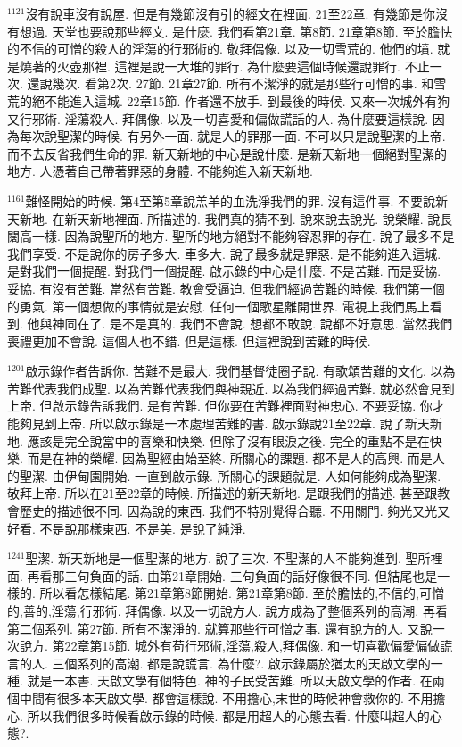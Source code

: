 \documentclass{book}
\begin{document}
$^{1121}$沒有說車沒有說屋.
但是有幾節沒有引的經文在裡面.
21至22章.
有幾節是你沒有想過.
天堂也要說那些經文.
是什麼.
我們看第21章.
第8節.
21章第8節.
至於膽怯的不信的可憎的殺人的淫蕩的行邪術的.
敬拜偶像.
以及一切雪荒的.
他們的墳.
就是燒著的火壺那裡.
這裡是說一大堆的罪行.
為什麼要這個時候還說罪行.
不止一次.
還說幾次.
看第2次.
27節.
21章27節.
所有不潔淨的就是那些行可憎的事.
和雪荒的絕不能進入這城.
22章15節.
作者還不放手.
到最後的時候.
又來一次城外有狗又行邪術.
淫蕩殺人.
拜偶像.
以及一切喜愛和偏做謊話的人.
為什麼要這樣說.
因為每次說聖潔的時候.
有另外一面.
就是人的罪那一面.
不可以只是說聖潔的上帝.
而不去反省我們生命的罪.
新天新地的中心是說什麼.
是新天新地一個絕對聖潔的地方.
人憑著自己帶著罪惡的身體.
不能夠進入新天新地.

$^{1161}$難怪開始的時候.
第4至第5章說羔羊的血洗淨我們的罪.
沒有這件事.
不要說新天新地.
在新天新地裡面.
所描述的.
我們真的猜不到.
說來說去說光.
說榮耀.
說長闊高一樣.
因為說聖所的地方.
聖所的地方絕對不能夠容忍罪的存在.
說了最多不是我們享受.
不是說你的房子多大.
車多大.
說了最多就是罪惡.
是不能夠進入這城.
是對我們一個提醒.
對我們一個提醒.
啟示錄的中心是什麼.
不是苦難.
而是妥協.
妥協.
有沒有苦難.
當然有苦難.
教會受逼迫.
但我們經過苦難的時候.
我們第一個的勇氣.
第一個想做的事情就是安慰.
任何一個歌星離開世界.
電視上我們馬上看到.
他與神同在了.
是不是真的.
我們不會說.
想都不敢說.
說都不好意思.
當然我們喪禮更加不會說.
這個人也不錯.
但是這樣.
但這裡說到苦難的時候.

$^{1201}$啟示錄作者告訴你.
苦難不是最大.
我們基督徒圈子說.
有歌頌苦難的文化.
以為苦難代表我們成聖.
以為苦難代表我們與神親近.
以為我們經過苦難.
就必然會見到上帝.
但啟示錄告訴我們.
是有苦難.
但你要在苦難裡面對神忠心.
不要妥協.
你才能夠見到上帝.
所以啟示錄是一本處理苦難的書.
啟示錄說21至22章.
說了新天新地.
應該是完全說當中的喜樂和快樂.
但除了沒有眼淚之後.
完全的重點不是在快樂.
而是在神的榮耀.
因為聖經由始至終.
所關心的課題.
都不是人的高興.
而是人的聖潔.
由伊甸園開始.
一直到啟示錄.
所關心的課題就是.
人如何能夠成為聖潔.
敬拜上帝.
所以在21至22章的時候.
所描述的新天新地.
是跟我們的描述.
甚至跟教會歷史的描述很不同.
因為說的東西.
我們不特別覺得合聽.
不用關門.
夠光又光又好看.
不是說那樣東西.
不是美.
是說了純淨.

$^{1241}$聖潔.
新天新地是一個聖潔的地方.
說了三次.
不聖潔的人不能夠進到.
聖所裡面.
再看那三句負面的話.
由第21章開始.
三句負面的話好像很不同.
但結尾也是一樣的.
所以看怎樣結尾.
第21章第8節開始.
第21章第8節.
至於膽怯的,不信的,可憎的,善的,淫蕩,行邪術.
拜偶像.
以及一切說方人.
說方成為了整個系列的高潮.
再看第二個系列.
第27節.
所有不潔淨的.
就算那些行可憎之事.
還有說方的人.
又說一次說方.
第22章第15節.
城外有苟行邪術,淫蕩,殺人,拜偶像.
和一切喜歡偏愛偏做謊言的人.
三個系列的高潮.
都是說謊言.
為什麼?.
啟示錄屬於猶太的天啟文學的一種.
就是一本書.
天啟文學有個特色.
神的子民受苦難.
所以天啟文學的作者.
在兩個中間有很多本天啟文學.
都會這樣說.
不用擔心,末世的時候神會救你的.
不用擔心.
所以我們很多時候看啟示錄的時候.
都是用超人的心態去看.
什麼叫超人的心態?.
\end{document}
